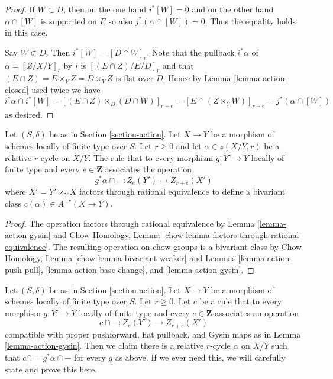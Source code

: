 \begin{proof}
\medskip\noindent
If $W \subset D$, then on the one hand $i^*[W] = 0$ and on the
other hand $\alpha \cap [W]$ is supported on $E$ so also
$j^*(\alpha \cap [W]) = 0$. Thus the equality holds in this case.

\medskip\noindent
Say $W \not \subset D$. Then $i^*[W] = [D \cap W]_e$.
Note that the pullback $i^*\alpha$ of $\alpha = [Z/X/Y]_r$
by $i$ is $[(E \cap Z)/E/D]_r$ and that
$(E \cap Z) = E \times_Y Z = D \times_Y Z$
is flat over $D$. Hence by Lemma \ref{lemma-action-closed}
used twice we have
$$
i^*\alpha \cap i^*[W] =
[(E \cap Z) \times_D (D \cap W)]_{r + e} =
[E \cap (Z \times_Y W)]_{r + e} =
j^*(\alpha \cap [W])
$$
as desired.
\end{proof}

\begin{proposition}
\label{proposition-get-bivariant-class}
Let $(S, \delta)$ be as in Section \ref{section-action}. Let $X \to Y$
be a morphism of schemes locally of finite type over $S$. Let $r \geq 0$
and let $\alpha \in z(X/Y, r)$ be a relative $r$-cycle on $X/Y$.
The rule that to every morphism $g : Y' \to Y$ locally of finite type
and every $e \in \mathbf{Z}$ associates the operation
$$
g^*\alpha \cap - : Z_e(Y') \to Z_{r + e}(X')
$$
where $X' = Y' \times_Y X$ factors through rational equivalence to
define a bivariant class $c(\alpha) \in A^{-r}(X \to Y)$.
\end{proposition}

\begin{proof}
The operation factors through rational equivalence by
Lemma \ref{lemma-action-gysin} and
Chow Homology, Lemma \ref{chow-lemma-factors-through-rational-equivalence}.
The resulting operation on chow groups is a bivariant class by
Chow Homology, Lemma \ref{chow-lemma-bivariant-weaker}
and
Lemmas \ref{lemma-action-push-pull}, \ref{lemma-action-base-change}, and
\ref{lemma-action-gysin}.
\end{proof}

\begin{remark}
\label{remark-characterize-relative-cycles}
Let $(S, \delta)$ be as in Section \ref{section-action}. Let $X \to Y$
be a morphism of schemes locally of finite type over $S$. Let $r \geq 0$.
Let $c$ be a rule that to every morphism $g : Y' \to Y$ locally of finite
type and every $e \in \mathbf{Z}$ associates an operation
$$
c \cap - : Z_e(Y') \to Z_{r + e}(X')
$$
compatible with proper pushforward, flat pullback, and Gysin maps as in
Lemma \ref{lemma-action-gysin}. Then we claim there is a relative $r$-cycle
$\alpha$ on $X/Y$ such that $c \cap = g^*\alpha \cap -$ for every $g$ as above.
If we ever need this, we will carefully state and prove this here.
\end{remark}









